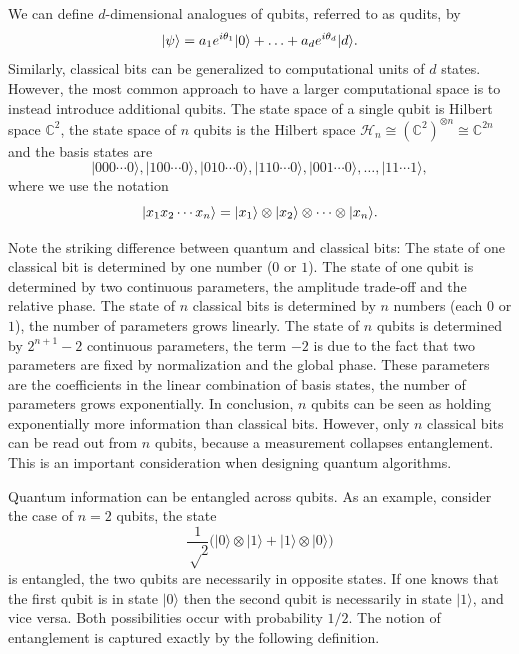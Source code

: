We can define $d$-dimensional analogues of qubits, referred to as qudits, by
\begin{equation}
  \lvert\psi\rangle = a_1 e^{i\theta_1} \lvert0\rangle + \ldots + a_d e^{i \theta_d} \lvert d\rangle.
\end{equation}
Similarly, classical bits can be generalized to computational units of $d$ states. However, the most common approach to have a larger computational space is to instead introduce additional qubits. The state space of a single qubit is Hilbert space $\mathbb{C}^2$, the state space of $n$ qubits is the Hilbert space $\mathcal{H}_n \cong (\mathbb{C}^2)^{\otimes n} \cong \mathbb{C}^{2n}$ and the basis states are
\begin{equation}
  |000⋯0⟩, |100⋯0⟩, |010⋯0⟩, |110⋯0⟩, |001⋯0⟩, …, |11⋯1⟩,
\end{equation}
where we use the notation
\begin{equation}
  \lvert x_1x_2\cdots x_n\rangle = \lvert x_1\rangle\otimes\lvert x_2\rangle\otimes\cdots\otimes\lvert x_n\rangle.
\end{equation}

Note the striking difference between quantum and classical bits:
The state of one classical bit is determined by one number ($0$ or $1$).
The state of one qubit is determined by two continuous parameters, the amplitude trade-off and the relative phase.
The state of $n$ classical bits is determined by $n$ numbers (each $0$ or $1$), the number of parameters grows linearly.
The state of $n$ qubits is determined by $2^{n+1}-2$ continuous parameters, the term $-2$ is due to the fact that two parameters are fixed by normalization and the global phase. These parameters are the coefficients in the linear combination of basis states, the number of parameters grows exponentially. In conclusion, $n$ qubits can be seen as holding exponentially more information than classical bits. However, only $n$ classical bits can be read out from $n$ qubits, because a measurement collapses entanglement. This is an important consideration when designing quantum algorithms.

Quantum information can be entangled across qubits. As an example, consider the case of $n = 2$ qubits, the state
\begin{equation}
  \frac{1}{√2}\big(|0⟩⊗|1⟩ + |1⟩⊗|0⟩\big)
\end{equation}
is entangled, the two qubits are necessarily in opposite states. If one knows that the first qubit is in state $|0⟩$ then the second qubit is necessarily in state $|1⟩$, and vice versa. Both possibilities occur with probability $1/2$. The notion of entanglement is captured exactly by the following definition.

